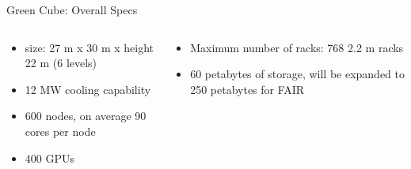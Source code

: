 \begin{frame}{Green Cube: Overall Specs}
    \begin{columns}
        \begin{column}{0.5\textwidth}
            \begin{itemize}
                \item size: 27 \si{\meter} x 30 \si{\meter} x height 22 \si{\meter} (6 levels)
                \item 12 \si{\mega\watt} cooling capability
                \item 600 nodes, on average 90 cores per node
                \item 400 GPUs
            \end{itemize}
        \end{column}
        \begin{column}{0.5\textwidth}
            \begin{itemize}
                \item Maximum number of racks: 768 2.2 \si{\meter} racks
                \item 60 petabytes of storage, will be expanded to 250 petabytes for FAIR
            \end{itemize}
        \end{column}
    \end{columns}
\end{frame}


